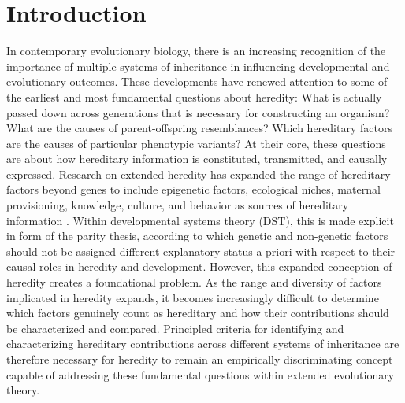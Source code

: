 \documentclass[pdflatex,sn-mathphys-num]{sn-jnl}
\theoremstyle{thmstylethree}
\theoremstyle{thmstyleone}
\begin{document}
\maketitle

\section{Introduction}
In contemporary evolutionary biology, there is an increasing recognition of the importance of multiple systems of inheritance in influencing developmental and evolutionary outcomes. These developments have renewed attention to some of the earliest and most fundamental questions about heredity: What is actually passed down across generations that is necessary for constructing an organism? What are the causes of parent-offspring resemblances? Which hereditary factors are the causes of particular phenotypic variants? At their core, these questions are about how hereditary information is constituted, transmitted, and causally expressed. Research on extended heredity has expanded the range of hereditary factors beyond genes to include epigenetic factors, ecological niches, maternal provisioning, knowledge, culture, and behavior as sources of hereditary information \cite{bonduriansky2020extended}. Within developmental systems theory (DST), this is made explicit in form of the parity thesis, according to which genetic and non-genetic factors should not be assigned different explanatory status a priori with respect to their causal roles in heredity and development. However, this expanded conception of heredity creates a foundational problem. As the range and diversity of factors implicated in heredity expands, it becomes increasingly difficult to determine which factors genuinely count as hereditary and how their contributions should be characterized and compared. Principled criteria for identifying and characterizing hereditary contributions across different systems of inheritance are therefore necessary for heredity to remain an empirically discriminating concept capable of addressing these fundamental questions within extended evolutionary theory.
\end{document}
